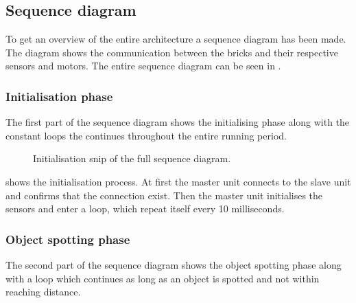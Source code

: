 \subsection{Sequence diagram}
To get an overview of the entire architecture a sequence diagram has been made. The diagram shows the communication between the bricks and their respective sensors and motors. The entire sequence diagram can be seen in .

\subsubsection{Initialisation phase}
The first part of the sequence diagram shows the initialising phase along with the constant loops the continues throughout the entire running period. 

\begin{figure}[H]
     \caption{\label{fig:sequence-diagram-initialisation-appendix} Initialisation snip of the full sequence diagram.}
\end{figure}

 shows the initialisation process. At first the master unit connects to the slave unit and confirms that the connection exist. Then the master unit initialises the sensors and enter a loop, which repeat itself every 10 milliseconds. 

\subsubsection{Object spotting phase}
The second part of the sequence diagram shows the object spotting phase along with a loop which continues as long as an object is spotted and not within reaching distance.

